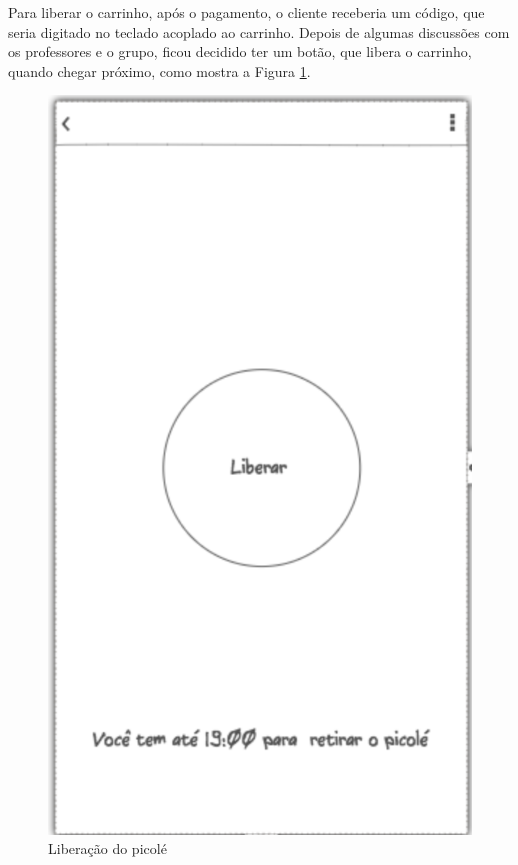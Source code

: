 \newpage

Para liberar o carrinho, após o pagamento, o cliente receberia um código, que seria digitado no teclado acoplado ao carrinho. Depois de algumas discussões com os professores e o grupo, ficou decidido ter um botão, que libera o carrinho, quando chegar próximo, como mostra a Figura \ref{fig:liberacao}.

\begin{figure}[H]
	\centering
    \includegraphics[scale=0.7]{figuras/liberacao}
	\caption{Liberação do picolé}
    \label{fig:liberacao}
\end{figure}


